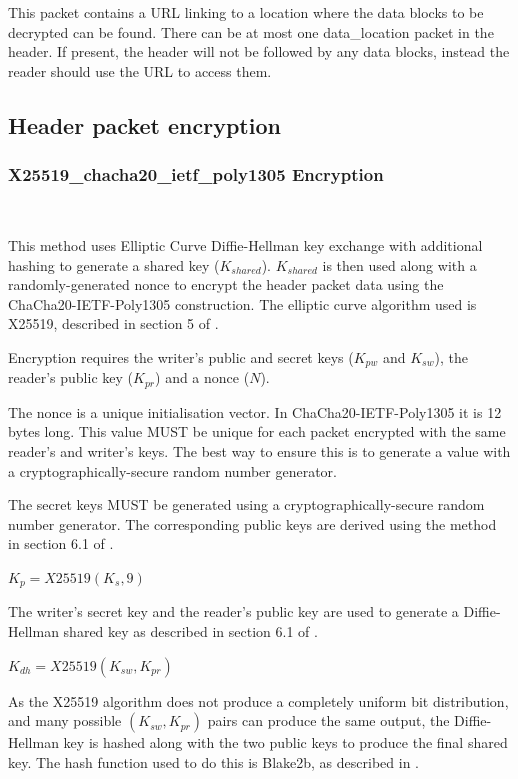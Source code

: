 \documentclass[10pt]{article}
\begin{document}
This packet contains a URL linking to a location where the data blocks to be
decrypted can be found.
There can be at most one data\_location packet in the header.
If present, the header will not be followed by any data blocks,
instead the reader should use the URL to access them.

\subsection{Header packet encryption}

\subsubsection{X25519\_chacha20\_ietf\_poly1305 Encryption}~\label{header:X25519}

This method uses Elliptic Curve Diffie-Hellman key exchange with additional hashing to generate a shared
key ($K_{shared}$).
$K_{shared}$ is then used along with a randomly-generated nonce to encrypt the header packet data using the
ChaCha20-IETF-Poly1305 construction.
The elliptic curve algorithm used is X25519, described in section 5 of \cite{RFC7748}.

Encryption requires the writer's public and secret keys ($K_{pw}$ and $K_{sw}$), the reader's public key ($K_{pr}$)
and a nonce ($N$).

The nonce is a unique initialisation vector.
In ChaCha20-IETF-Poly1305 it is 12 bytes long.
This value MUST be unique for each packet encrypted with the same reader's and writer's keys.
The best way to ensure this is to generate a value with a cryptographically-secure random number generator.

The secret keys MUST be generated using a cryptographically-secure random number generator.
The corresponding public keys are derived using the method in section 6.1 of \cite{RFC7748}.

$K_p = X25519(K_s, 9)$

The writer's secret key and the reader's public key are used to generate a Diffie-Hellman shared key as described in
section 6.1 of \cite{RFC7748}.

$K_{dh} = X25519(K_{sw}, K_{pr})$

As the X25519 algorithm does not produce a completely uniform bit distribution,
and many possible $(K_{sw}, K_{pr})$ pairs can produce the same output,
the Diffie-Hellman key is hashed along with the two public keys to produce the final shared key.
The hash function used to do this is Blake2b, as described in \cite{RFC7693}.
\end{document}
